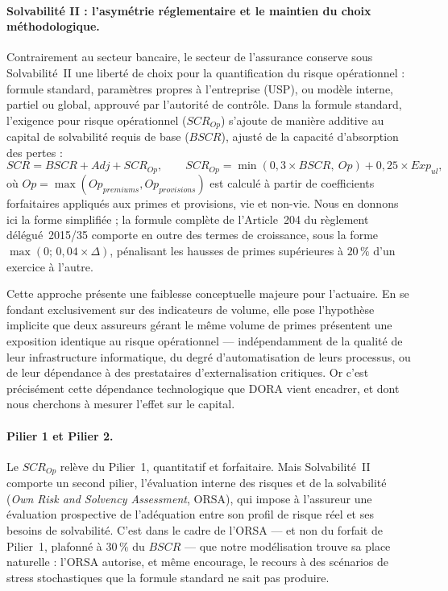 \documentclass[11pt,a4paper]{article}
\theoremstyle{navystyle}
\theoremstyle{navydef}
\begin{document}
\paragraph{Solvabilité II : l'asymétrie réglementaire et le maintien du choix méthodologique.}
Contrairement au secteur bancaire, le secteur de l'assurance conserve sous Solvabilité~II
une liberté de choix pour la quantification du risque opérationnel : formule standard,
paramètres propres à l'entreprise (USP), ou modèle interne, partiel ou global, approuvé
par l'autorité de contrôle. Dans la formule standard, l'exigence pour risque opérationnel
($SCR_{Op}$) s'ajoute de manière additive au capital de solvabilité requis de base
($BSCR$), ajusté de la capacité d'absorption des pertes :
\begin{equation}
SCR = BSCR + Adj + SCR_{Op},
\qquad
SCR_{Op} = \min(0{,}3 \times BSCR,\ Op) + 0{,}25 \times Exp_{ul},
\end{equation}
où $Op = \max(Op_{premiums}, Op_{provisions})$ est calculé à partir de coefficients
forfaitaires appliqués aux primes et provisions, vie et non-vie. Nous en donnons ici la
forme simplifiée ; la formule complète de l'Article~204 du règlement délégué~2015/35
comporte en outre des termes de croissance, sous la forme
$\max\!\left(0;\, 0{,}04 \times \Delta\!\right)$, pénalisant les hausses de primes
supérieures à $20\,\%$ d'un exercice à l'autre.

Cette approche présente une faiblesse conceptuelle majeure pour l'actuaire. En se fondant
exclusivement sur des indicateurs de volume, elle pose l'hypothèse implicite que deux
assureurs gérant le même volume de primes présentent une exposition identique au risque
opérationnel --- indépendamment de la qualité de leur infrastructure informatique, du
degré d'automatisation de leurs processus, ou de leur dépendance à des prestataires
d'externalisation critiques. Or c'est précisément cette dépendance technologique que DORA
vient encadrer, et dont nous cherchons à mesurer l'effet sur le capital.

\paragraph{Pilier 1 et Pilier 2.} Le $SCR_{Op}$ relève du Pilier~1, quantitatif et
forfaitaire. Mais Solvabilité~II comporte un second pilier, l'évaluation interne des
risques et de la solvabilité (\emph{Own Risk and Solvency Assessment}, ORSA), qui impose
à l'assureur une évaluation prospective de l'adéquation entre son profil de risque réel
et ses besoins de solvabilité. C'est dans le cadre de l'ORSA --- et non du forfait de
Pilier~1, plafonné à $30\,\%$ du $BSCR$ --- que notre modélisation trouve sa place
naturelle : l'ORSA autorise, et même encourage, le recours à des scénarios de stress
stochastiques que la formule standard ne sait pas produire.
\end{document}
